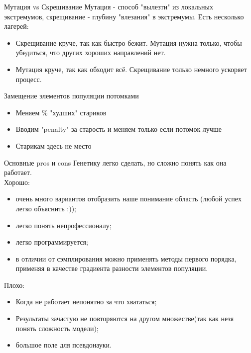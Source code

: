 \documentclass[14pt, fleqn, xcolor={dvipsnames, table}]{beamer}
\begin{document}
\begin{frame}{Мутация vs Скрещивание}
Мутация - способ "вылезти" из локальных экстремумов, скрещивание - глубину "влезания" в экстремумы. Есть несколько лагерей:
\begin{itemize}
  \item Скрещивание круче, так как быстро бежит. Мутация нужна только, чтобы убедиться, что других хороших направлений нет.
  \item Мутация круче, так как обходит всё. Скрещивание только немного ускоряет процесс.
\end{itemize}
\end{frame}

\begin{frame}{Замещение элементов популяции потомками}
\begin{itemize}
  \item Меняем \% "худших" стариков 
  \item Вводим "penalty" за старость и меняем только если потомок лучше
  \item Старикам здесь не место
\end{itemize}
\end{frame}

\begin{frame}{Основные pros и cons}
\footnotesize
Генетику легко сделать, но сложно понять как она работает. \\
Хорошо:
\begin{itemize}
  \item очень много вариантов отобразить наше понимание область (любой успех легко объяснить :));
  \item легко понять непрофессионалу;
  \item легко программируется;
  \item в отличии от сэмплирования можно применять методы первого порядка, применяя в качестве градиента разности элементов популяции.
\end{itemize}
Плохо:
\begin{itemize}
  \item Когда не работает непонятно за что хвататься;
  \item Результаты зачастую не повторяются на другом множестве(так как незя понять сложность модели);
  \item большое поле для псевдонауки.
\end{itemize}
\end{frame}
\end{document}
